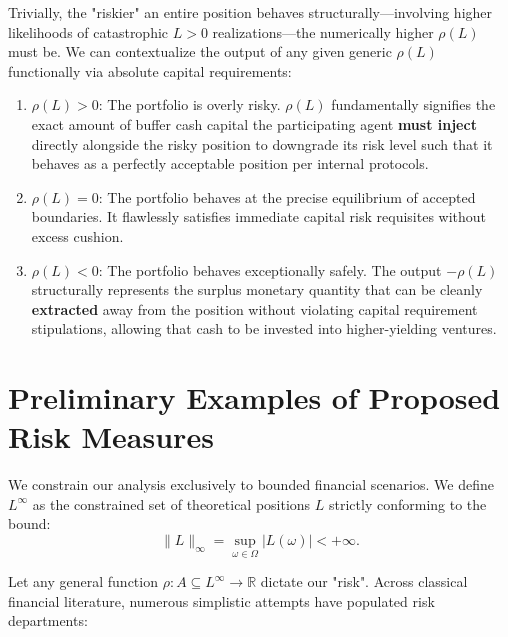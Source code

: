 Trivially, the "riskier" an entire position behaves structurally—involving higher likelihoods of catastrophic $L > 0$ realizations—the numerically higher $\rho(L)$ must be. We can contextualize the output of any given generic $\rho(L)$ functionally via absolute capital requirements:
\begin{enumerate}
    \item $\rho(L) > 0$: The portfolio is overly risky. $\rho(L)$ fundamentally signifies the exact amount of buffer cash capital the participating agent \textbf{must inject} directly alongside the risky position to downgrade its risk level such that it behaves as a perfectly acceptable position per internal protocols.
    \item $\rho(L) = 0$: The portfolio behaves at the precise equilibrium of accepted boundaries. It flawlessly satisfies immediate capital risk requisites without excess cushion.
    \item $\rho(L) < 0$: The portfolio behaves exceptionally safely. The output $-\rho(L)$ structurally represents the surplus monetary quantity that can be cleanly \textbf{extracted} away from the position without violating capital requirement stipulations, allowing that cash to be invested into higher-yielding ventures.
\end{enumerate}

\section{Preliminary Examples of Proposed Risk Measures}

We constrain our analysis exclusively to bounded financial scenarios. We define $L^\infty$ as the constrained set of theoretical positions $L$ strictly conforming to the bound:
$$
\|L\|_\infty = \sup_{\omega \in \Omega} |L(\omega)| < +\infty.
$$

Let any general function $\rho: A \subseteq L^\infty \to \mathbb{R}$ dictate our "risk". Across classical financial literature, numerous simplistic attempts have populated risk departments:

